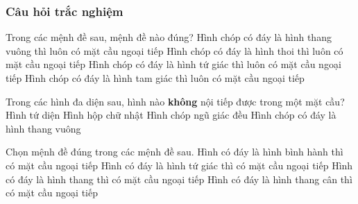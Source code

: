 \subsubsection{Câu hỏi trắc nghiệm}
\begin{ex}%
	Trong các mệnh đề sau, mệnh đề nào đúng?
	\choice
	{Hình chóp có đáy là hình thang vuông thì luôn có mặt cầu ngoại tiếp}
	{Hình chóp có đáy là hình thoi thì luôn có mặt cầu ngoại tiếp}
	{Hình chóp có đáy là hình tứ giác thì luôn có mặt cầu ngoại tiếp}
	{\True Hình chóp có đáy là hình tam giác thì luôn có mặt cầu ngoại tiếp}
\end{ex}
\begin{ex}%
	Trong các hình đa diện sau, hình nào \textbf{không} nội tiếp được trong một mặt cầu?
	\choice
	{Hình tứ diện}
	{Hình hộp chữ nhật}
	{Hình chóp ngũ giác đều}
	{\True Hình chóp có đáy là hình thang vuông}
\end{ex}
\begin{ex}%
	Chọn mệnh đề đúng trong các mệnh đề sau.
	\choice
	{Hình có đáy là hình bình hành thì có mặt cầu ngoại tiếp}
	{Hình có đáy là hình tứ giác thì có mặt cầu ngoại tiếp}
	{Hình có đáy là hình thang thì có mặt cầu ngoại tiếp}
	{\True Hình có đáy là hình thang cân thì có mặt cầu ngoại tiếp}
\end{ex}

